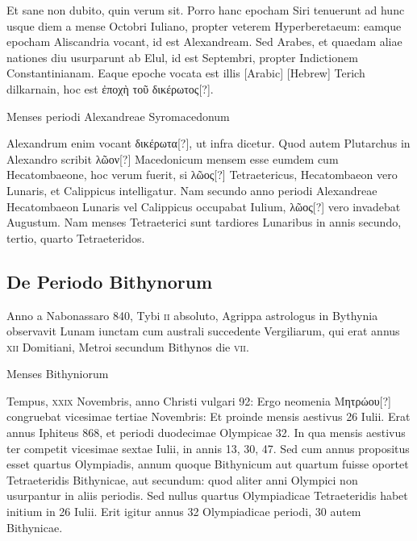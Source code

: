 Et sane non dubito, quin verum sit.
Porro hanc epocham Siri
tenuerunt ad hunc usque diem a mense Octobri Iuliano, propter veterem
Hyperberetaeum: eamque epocham Aliscandria vocant, id est
Alexandream.
Sed Arabes, et quaedam aliae nationes diu usurparunt
ab Elul, id est Septembri, propter Indictionem
Constantinianam.
Eaque epoche vocata
est illis \textarabic{[Arabic]} \texthebrew{[Hebrew]}
Terich dilkarnain, hoc est \textgreek{ἐποχὴ τοῦ δικέρωτος[?]}.
\begin{table}[htbp]
\centering

\caption{Menses periodi Alexandreae Syromacedonum}
\label{tab:menses_alexandreae}
\end{table}
Alexandrum enim vocant \textgreek{δικέρωτα[?]}, ut infra
dicetur.
Quod autem Plutarchus in Alexandro
scribit \textgreek{λῶον[?]} Macedonicum mensem esse
eumdem cum Hecatombaeone, hoc verum
fuerit, si \textgreek{λῶος[?]} Tetraetericus, Hecatombaeon
vero Lunaris, et Calippicus intelligatur.
Nam
secundo anno periodi Alexandreae Hecatombaeon
Lunaris vel Calippicus occupabat Iulium, \textgreek{λῶος[?]} vero invadebat
Augustum.
Nam menses Tetraeterici sunt tardiores Lunaribus in
annis secundo, tertio, quarto Tetraeteridos.

\subsection{De Periodo Bithynorum}

Anno a Nabonassaro 840, Tybi \textsc{ii} absoluto, Agrippa astrologus
in Bythynia observavit Lunam iunctam cum australi succedente
Vergiliarum, qui erat annus \textsc{xii} Domitiani, Metroi
secundum Bithynos die \textsc{vii}.
\begin{table}[htbp]
\centering

\caption{Menses Bithyniorum}
\label{tab:menses_bithyniorum}
\end{table}
Tempus, \textsc{xxix} Novembris, anno
Christi vulgari 92:
Ergo neomenia \textgreek{Μητρώου[?]} congruebat vicesimae tertiae
Novembris:
Et proinde mensis aestivus 26 Iulii.
Erat annus Iphiteus
868, et periodi duodecimae Olympicae
32.
In qua mensis aestivus ter competit
vicesimae sextae Iulii, in annis 13, 30, 47.
Sed cum annus propositus esset quartus Olympiadis,
annum quoque Bithynicum
aut quartum fuisse oportet Tetraeteridis Bithynicae,
aut secundum: quod aliter anni
Olympici non usurpantur in aliis periodis.
Sed nullus quartus Olympiadicae Tetraeteridis
habet initium in 26 Iulii.
Erit igitur
annus 32 Olympiadicae periodi, 30 autem
Bithynicae.

